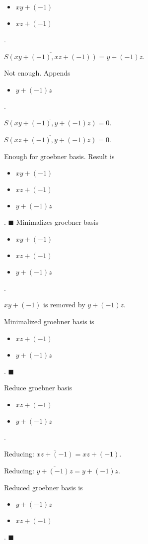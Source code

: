 \begin{itemize}
\item $xy+(-1)$
\item $xz+(-1)$
\end{itemize}  .


$\overline{S(xy+(-1), xz+(-1))} = y+(-1)z$.

Not enough.  Appends \begin{itemize}
\item $y+(-1)z$
\end{itemize}  .


$\overline{S(xy+(-1), y+(-1)z)} = 0$.

$\overline{S(xz+(-1), y+(-1)z)} = 0$.

Enough for groebner basis.  Result is \begin{itemize}
\item $xy+(-1)$
\item $xz+(-1)$
\item $y+(-1)z$
\end{itemize}  .
$\blacksquare{}$
Minimalizes groebner basis
\begin{itemize}
\item $xy+(-1)$
\item $xz+(-1)$
\item $y+(-1)z$
\end{itemize}  .


$xy+(-1)$ is removed by $y+(-1)z$.

Minimalized groebner basis is
\begin{itemize}
\item $xz+(-1)$
\item $y+(-1)z$
\end{itemize}  .
$\blacksquare{}$

Reduce groebner basis
\begin{itemize}
\item $xz+(-1)$
\item $y+(-1)z$
\end{itemize}  .


Reducing: $\overline{xz+(-1)} = xz+(-1)$.

Reducing: $\overline{y+(-1)z} = y+(-1)z$.

Reduced groebner basis is
\begin{itemize}
\item $y+(-1)z$
\item $xz+(-1)$
\end{itemize}  .
$\blacksquare{}$
